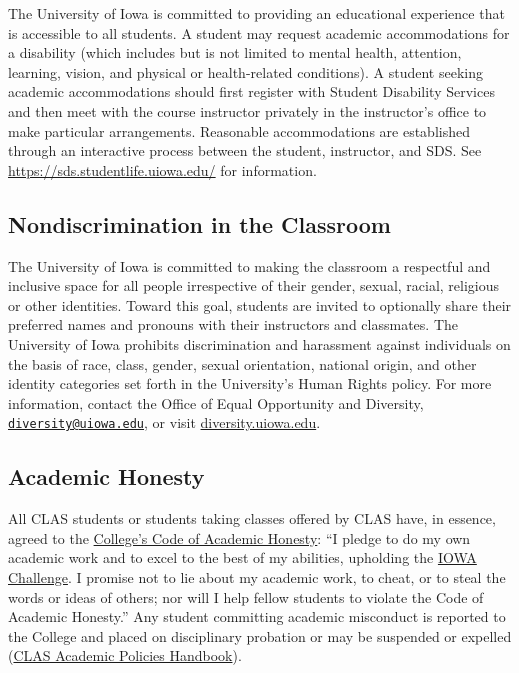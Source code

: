 \documentclass[11pt,]{article}
\theoremstyle{definition}
\theoremstyle{definition}
\theoremstyle{remark}
\begin{document}
The University of Iowa is committed to providing an educational
experience that is accessible to all students. A student may request
academic accommodations for a disability (which includes but is not
limited to mental health, attention, learning, vision, and physical or
health-related conditions). A student seeking academic accommodations
should first register with Student Disability Services and then meet
with the course instructor privately in the instructor's office to make
particular arrangements. Reasonable accommodations are established
through an interactive process between the student, instructor, and SDS.
See \url{https://sds.studentlife.uiowa.edu/} for information.

\subsection{Nondiscrimination in the
Classroom}\label{nondiscrimination-in-the-classroom}

The University of Iowa is committed to making the classroom a respectful
and inclusive space for all people irrespective of their gender, sexual,
racial, religious or other identities. Toward this goal, students are
invited to optionally share their preferred names and pronouns with
their instructors and classmates. The University of Iowa prohibits
discrimination and harassment against individuals on the basis of race,
class, gender, sexual orientation, national origin, and other identity
categories set forth in the University's Human Rights policy. For more
information, contact the Office of Equal Opportunity and Diversity,
\href{mailto:diversity@uiowa.edu}{\nolinkurl{diversity@uiowa.edu}}, or
visit
\href{https://diversity.uiowa.edu/office/equal-opportunity-and-diversity}{diversity.uiowa.edu}.

\subsection{Academic Honesty}\label{academic-honesty}

All CLAS students or students taking classes offered by CLAS have, in
essence, agreed to the
\href{https://clas.uiowa.edu/students/handbook/academic-fraud-honor-code}{College's
Code of Academic Honesty}: ``I pledge to do my own academic work and to
excel to the best of my abilities, upholding the
\href{https://newstudents.uiowa.edu/iowa-challenge}{IOWA Challenge}. I
promise not to lie about my academic work, to cheat, or to steal the
words or ideas of others; nor will I help fellow students to violate the
Code of Academic Honesty.'' Any student committing academic misconduct
is reported to the College and placed on disciplinary probation or may
be suspended or expelled
(\href{https://clas.uiowa.edu/students/handbook}{CLAS Academic Policies
Handbook}).
\end{document}
